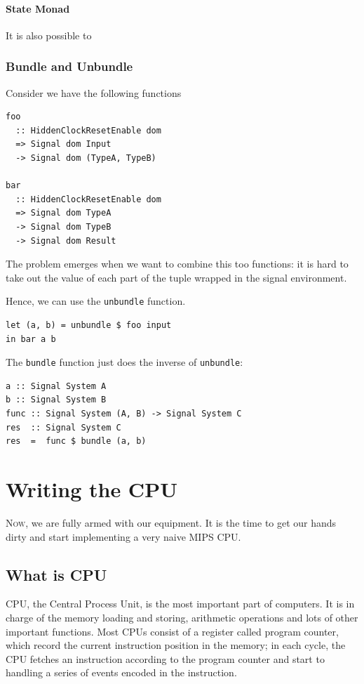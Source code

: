 \documentclass[a4paper,12pt, oneside]{book}
\begin{document}
\subsubsection{State Monad}
It is also possible to 
\subsection{Bundle and Unbundle}
Consider we have the following functions
\begin{verbatim}
foo
  :: HiddenClockResetEnable dom
  => Signal dom Input
  -> Signal dom (TypeA, TypeB)

bar
  :: HiddenClockResetEnable dom
  => Signal dom TypeA
  -> Signal dom TypeB
  -> Signal dom Result
\end{verbatim}
The problem emerges when we want to combine this too functions: it is hard to take out the value of each part of the tuple wrapped in the signal environment.

Hence, we can use the \texttt{unbundle} function.
\begin{verbatim}
let (a, b) = unbundle $ foo input
in bar a b
\end{verbatim}
The \texttt{bundle} function just does the inverse of \texttt{unbundle}:
\begin{verbatim}
a :: Signal System A
b :: Signal System B
func :: Signal System (A, B) -> Signal System C
res  :: Signal System C
res  =  func $ bundle (a, b)
\end{verbatim}
\chapter{Writing the CPU}
\lettrine{N}{ow}, we are fully armed with our equipment. It is the time to get our hands dirty and start implementing a very naive MIPS CPU.
\section{What is CPU}
CPU, the Central Process Unit, is the most important part of computers. It is in charge of the memory loading and storing, arithmetic operations and lots of other important functions. Most CPUs consist of a register called program counter, which record the current instruction position in the memory; in each cycle, the CPU fetches an instruction according to the program counter and start to handling a series of events encoded in the instruction.
\end{document}
